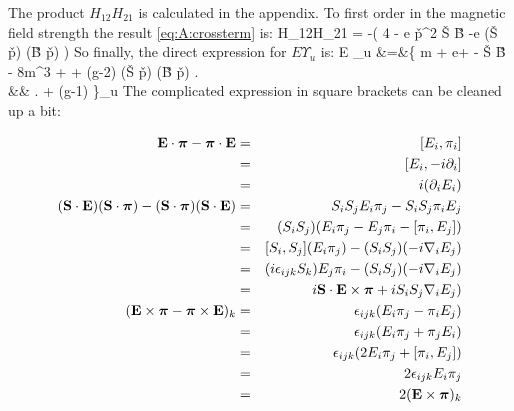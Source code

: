 The product $H_{12}H_{21}$ is calculated in the appendix.  To first order in the magnetic field strength the result \eqref{eq:A:crossterm} is:
\beq
 H_{12}H_{21}	= 	-\left( 
				 {4}  -  e \v{p}^2  \v{S} \cdot \v{B}   
				-e (\v{S} \cdot \v{p}) (\v{B} \cdot \v{p})
			\right)
\eeq
So finally, the direct expression for $E \Upsilon_u$ is:
\beqa	E \Upsilon_u 
		&=&\left \{ m + e\Phi +  -  \v{S} \cdot \v{B}
			-  {8m^3}  
			+ \frac{ e \v{p}^2  (\v{S} \cdot \v{B}) }{2m^3}
			+ (g-2) (\v{S} \cdot \v{p}) (\v{B} \cdot \v{p})
				 \right .	\\
		&&	\left . 
			+ (g-1)  			
			\right \}\Upsilon_u
\eeqa
The complicated expression in square brackets can be cleaned up a bit:

\begin{eqnarray*}
\mathbf{E} \cdot \mbox{\boldmath$ \pi $} - \mbox{\boldmath$ \pi $} \cdot \mathbf{E}
	&=&	[E_i, \pi_i]			\\
	&=&	[E_i, -i\partial_i]	\\
	&=&	i(\partial_i E_i)		\\
(\mathbf{S} \cdot \mathbf{E}) (\mathbf{S} \cdot \mbox{\boldmath$ \pi $}) - (\mathbf{S} \cdot \mbox{\boldmath$ \pi $}) (\mathbf{S} \cdot \mathbf{E})
	&=&	S_i S_j E_i \pi_j - S_i S_j \pi_i E_j						\\
	&=&	(S_i S_j) (E_i \pi_j - E_j \pi_i - [\pi_i, E_j])					\\
	&=&	[S_i, S_j](E_i \pi_j) - (S_i S_j)(-i \nabla_i E_j)				\\
	&=&	(i\epsilon_{ijk}S_k)E_j \pi_i -  (S_i S_j)(-i \nabla_i E_j)		\\
	&=&	i \mathbf{S} \cdot \mathbf{E} \times \mbox{\boldmath$ \pi $} + i S_i S_j \nabla_i E_j)	\\
(\mathbf{E} \times \mbox{\boldmath$ \pi $} - \mbox{\boldmath$ \pi $} \times \mathbf{E})_k
	&=&	\epsilon_{ijk}(E_i \pi_j - \pi_i E_j)		\\
	&=&	\epsilon_{ijk}(E_i \pi_j + \pi_j E_i)		\\
	&=&	\epsilon_{ijk}(2 E_i \pi_j + [\pi_i, E_j])	\\
	&=&	2 \epsilon_{ijk} E_i \pi_j				\\
	&=&	2 (\mathbf{E} \times \mbox{\boldmath$ \pi $})_k
\end{eqnarray*}

